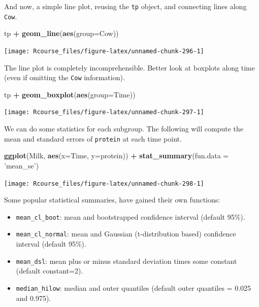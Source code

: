 \documentclass[]{book}
\newenvironment{Shaded}{\begin{snugshade}}{\end{snugshade}}
\newcommand{\KeywordTok}[1]{\textcolor[rgb]{0.13,0.29,0.53}{\textbf{#1}}}
\newcommand{\DataTypeTok}[1]{\textcolor[rgb]{0.13,0.29,0.53}{#1}}
\newcommand{\StringTok}[1]{\textcolor[rgb]{0.31,0.60,0.02}{#1}}
\newcommand{\OperatorTok}[1]{\textcolor[rgb]{0.81,0.36,0.00}{\textbf{#1}}}
\newcommand{\NormalTok}[1]{#1}
\providecommand{\tightlist}{%
  \setlength{\itemsep}{0pt}\setlength{\parskip}{0pt}}
\theoremstyle{definition}
\theoremstyle{definition}
\theoremstyle{definition}
\theoremstyle{remark}
\begin{document}
And now, a simple line plot, reusing the \texttt{tp} object, and
connecting lines along \texttt{Cow}.

\begin{Shaded}
\begin{Highlighting}[]
\NormalTok{tp }\OperatorTok{+}\StringTok{ }\KeywordTok{geom_line}\NormalTok{(}\KeywordTok{aes}\NormalTok{(}\DataTypeTok{group=}\NormalTok{Cow))}
\end{Highlighting}
\end{Shaded}

\texttt{[image: Rcourse\_files/figure-latex/unnamed-chunk-296-1]}

The line plot is completely incomprehensible. Better look at boxplots
along time (even if omitting the \texttt{Cow} information).

\begin{Shaded}
\begin{Highlighting}[]
\NormalTok{tp }\OperatorTok{+}\StringTok{ }\KeywordTok{geom_boxplot}\NormalTok{(}\KeywordTok{aes}\NormalTok{(}\DataTypeTok{group=}\NormalTok{Time))}
\end{Highlighting}
\end{Shaded}

\texttt{[image: Rcourse\_files/figure-latex/unnamed-chunk-297-1]}

We can do some statistics for each subgroup. The following will compute
the mean and standard errors of \texttt{protein} at each time point.

\begin{Shaded}
\begin{Highlighting}[]
\KeywordTok{ggplot}\NormalTok{(Milk, }\KeywordTok{aes}\NormalTok{(}\DataTypeTok{x=}\NormalTok{Time, }\DataTypeTok{y=}\NormalTok{protein)) }\OperatorTok{+}
\StringTok{  }\KeywordTok{stat_summary}\NormalTok{(}\DataTypeTok{fun.data =} \StringTok{'mean_se'}\NormalTok{)}
\end{Highlighting}
\end{Shaded}

\texttt{[image: Rcourse\_files/figure-latex/unnamed-chunk-298-1]}

Some popular statistical summaries, have gained their own functions:

\begin{itemize}
\tightlist
\item
  \texttt{mean\_cl\_boot}: mean and bootstrapped confidence interval
  (default 95\%).
\item
  \texttt{mean\_cl\_normal}: mean and Gaussian (t-distribution based)
  confidence interval (default 95\%).
\item
  \texttt{mean\_dsl}: mean plus or minus standard deviation times some
  constant (default constant=2).
\item
  \texttt{median\_hilow}: median and outer quantiles (default outer
  quantiles = 0.025 and 0.975).
\end{itemize}
\end{document}
